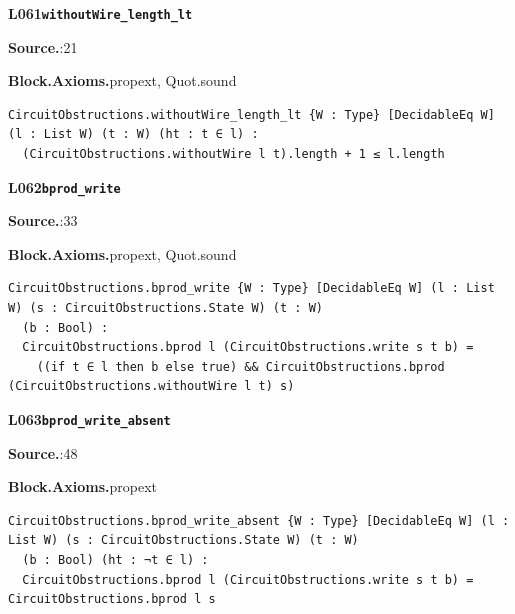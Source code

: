 \par\medskip\noindent\begin{minipage}{\textwidth}
{\small\bfseries L061\enspace\texttt{withoutWire\_length\_lt}\par}
{\footnotesize\raggedright\textbf{Source.}\enspace{}:21\par
\textbf{Block.}\quad\textbf{Axioms.}\enspace propext, Quot.sound\par}\nopagebreak
\begin{lstlisting}
CircuitObstructions.withoutWire_length_lt {W : Type} [DecidableEq W] (l : List W) (t : W) (ht : t ∈ l) :
  (CircuitObstructions.withoutWire l t).length + 1 ≤ l.length
\end{lstlisting}
\end{minipage}\par

\par\medskip\noindent\begin{minipage}{\textwidth}
{\small\bfseries L062\enspace\texttt{bprod\_write}\par}
{\footnotesize\raggedright\textbf{Source.}\enspace{}:33\par
\textbf{Block.}\quad\textbf{Axioms.}\enspace propext, Quot.sound\par}\nopagebreak
\begin{lstlisting}
CircuitObstructions.bprod_write {W : Type} [DecidableEq W] (l : List W) (s : CircuitObstructions.State W) (t : W)
  (b : Bool) :
  CircuitObstructions.bprod l (CircuitObstructions.write s t b) =
    ((if t ∈ l then b else true) && CircuitObstructions.bprod (CircuitObstructions.withoutWire l t) s)
\end{lstlisting}
\end{minipage}\par

\par\medskip\noindent\begin{minipage}{\textwidth}
{\small\bfseries L063\enspace\texttt{bprod\_write\_absent}\par}
{\footnotesize\raggedright\textbf{Source.}\enspace{}:48\par
\textbf{Block.}\quad\textbf{Axioms.}\enspace propext\par}\nopagebreak
\begin{lstlisting}
CircuitObstructions.bprod_write_absent {W : Type} [DecidableEq W] (l : List W) (s : CircuitObstructions.State W) (t : W)
  (b : Bool) (ht : ¬t ∈ l) :
  CircuitObstructions.bprod l (CircuitObstructions.write s t b) = CircuitObstructions.bprod l s
\end{lstlisting}
\end{minipage}\par

